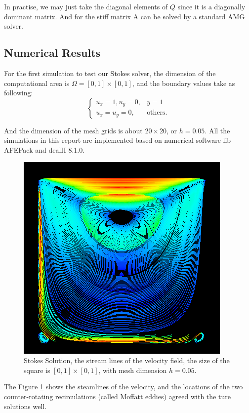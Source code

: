 \documentclass[a4paper]{article}
\begin{document}
In practise, we may just take the diagonal elements of $Q$ since it is
a diagonally dominant matrix. And for the stiff matrix A can be solved
by a standard AMG solver.

\subsection{Numerical Results}
For the first simulation to test our Stokes solver, the dimension of
the computational area is $\Omega = [0,1]\times[0,1]$, and the
boundary values take as following:
\begin{equation}
\left\lbrace
\begin{array}{ll}
u_x = 1, u_y = 0, & y = 1 \\
u_x = u_y = 0, & \mbox{others}.
\end{array}
\right.
\label{bd::value1}
\end{equation}

And the dimension of the mesh grids is about $20 \times 20$, or
$h=0.05$. All the simulations in this report are implemented based on
numerical software lib AFEPack and dealII 8.1.0. 

\begin{figure}[h]
\centering
\includegraphics[scale = 0.4]{images/Stokes.png}
\caption{Stokes Solution, the stream lines of the velocity field, the
  size of the square is $[0, 1] \times [0, 1]$, with mesh dimension $h = 0.05$.}
\label{im::Stokes-Solution}
\end{figure}

The Figure \ref{im::Stokes-Solution} shows the steamlines of the
velocity, and the locations of the two counter-rotating recirculations
(called Moffatt eddies) agreed with the ture solutions well.  
\end{document}
